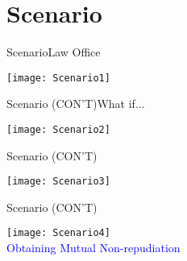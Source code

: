 \section{Scenario}

\begin{frame}{Scenario}{Law Office}
	\begin{center}
		\texttt{[image: Scenario1]}
	\end{center}
\end{frame}

\begin{frame}{Scenario (CON'T)}{What if...}
	\begin{center}
		\texttt{[image: Scenario2]}
	\end{center}
\end{frame}

\begin{frame}{Scenario (CON'T)}
	\begin{center}
		\texttt{[image: Scenario3]}
	\end{center}
\end{frame}

\begin{frame}{Scenario (CON'T)}
	\begin{center}
		\texttt{[image: Scenario4]}\\
        \textcolor{blue}{Obtaining Mutual Non-repudiation}
	\end{center}
\end{frame}